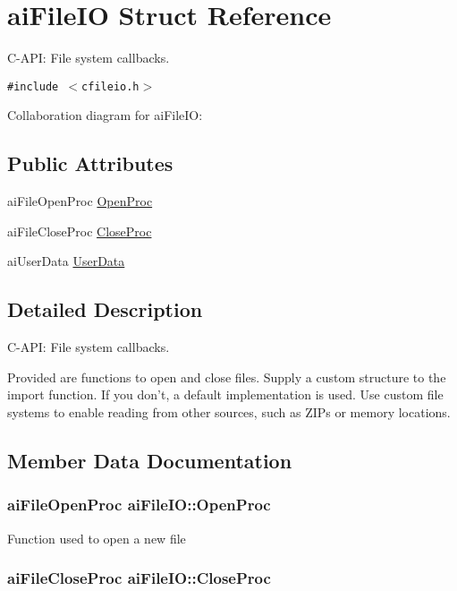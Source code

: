 \hypertarget{structai_file_i_o}{
\section{aiFileIO Struct Reference}
\label{structai_file_i_o}
}
C-API: File system callbacks.  


{\tt \#include $<$cfileio.h$>$}

Collaboration diagram for aiFileIO:\subsection*{Public Attributes}
\begin{CompactItemize}
\item 
aiFileOpenProc \hyperlink{structai_file_i_o_819d9c7823039294125068d06949a6df}{OpenProc}
\item 
aiFileCloseProc \hyperlink{structai_file_i_o_7ec702672712b5a02dc49cb17f980a14}{CloseProc}
\item 
aiUserData \hyperlink{structai_file_i_o_9c62b7f3d70fbb2f41e33ad0b9933139}{UserData}
\end{CompactItemize}


\subsection{Detailed Description}
C-API: File system callbacks. 

Provided are functions to open and close files. Supply a custom structure to the import function. If you don't, a default implementation is used. Use custom file systems to enable reading from other sources, such as ZIPs or memory locations. 

\subsection{Member Data Documentation}
\hypertarget{structai_file_i_o_819d9c7823039294125068d06949a6df}{
\subsubsection[OpenProc]{\setlength{\rightskip}{0pt plus 5cm}aiFileOpenProc {\bf aiFileIO::OpenProc}}}
\label{structai_file_i_o_819d9c7823039294125068d06949a6df}


Function used to open a new file \hypertarget{structai_file_i_o_7ec702672712b5a02dc49cb17f980a14}{
\subsubsection[CloseProc]{\setlength{\rightskip}{0pt plus 5cm}aiFileCloseProc {\bf aiFileIO::CloseProc}}}
\label{structai_file_i_o_7ec702672712b5a02dc49cb17f980a14}


